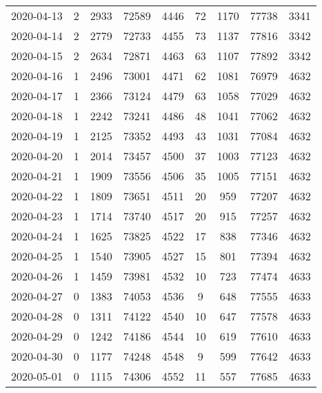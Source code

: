 \begin{longtable}{ccccccccc}
2020-04-13&2&2933&72589&4446&72&1170&77738&3341\\
2020-04-14&2&2779&72733&4455&73&1137&77816&3342\\
2020-04-15&2&2634&72871&4463&63&1107&77892&3342\\
2020-04-16&1&2496&73001&4471&62&1081&76979&4632\\
2020-04-17&1&2366&73124&4479&63&1058&77029&4632\\
2020-04-18&1&2242&73241&4486&48&1041&77062&4632\\
2020-04-19&1&2125&73352&4493&43&1031&77084&4632\\
2020-04-20&1&2014&73457&4500&37&1003&77123&4632\\
2020-04-21&1&1909&73556&4506&35&1005&77151&4632\\
2020-04-22&1&1809&73651&4511&20&959&77207&4632\\
2020-04-23&1&1714&73740&4517&20&915&77257&4632\\
2020-04-24&1&1625&73825&4522&17&838&77346&4632\\
2020-04-25&1&1540&73905&4527&15&801&77394&4632\\
2020-04-26&1&1459&73981&4532&10&723&77474&4633\\
2020-04-27&0&1383&74053&4536&9&648&77555&4633\\
2020-04-28&0&1311&74122&4540&10&647&77578&4633\\
2020-04-29&0&1242&74186&4544&10&619&77610&4633\\
2020-04-30&0&1177&74248&4548&9&599&77642&4633\\
2020-05-01&0&1115&74306&4552&11&557&77685&4633\\
\hline
\end{longtable}